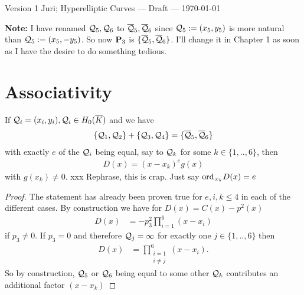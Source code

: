 \documentclass[english,11pt,a4paper]{article}
\begin{document}
\newpage

Version 1 \scriptsize \hfill Juri; Hyperelliptic Curves --- Draft --- \today
\normalsize

\textbf{Note:} I have renamed $\q_5, \q_6$ to $\bar \q_5, \bar \q_6$ since $\q_5 := (x_5,y_5)$ is more natural than $\q_5 := (x_5,-y_5)$. So now $\P_3$ is $\{ \bar \q_5, \bar \q_6 \}$. I'll change it in Chapter 1 as soon as I have the desire to do something tedious.

\section{Associativity}

\begin{lemma}
  If $\q_i = (x_i, y_i) ,\q_i \in \enkb$ and we have 
  \begin{align*}
    \{ \q_1 , \q_2\}+\{\q_3 , \q_4\} = \{\bar \q_5 , \bar \q_6 \}
  \end{align*}
  with exactly $e$ of the $\q_i$ being equal, say to $\q_k$ for some $k \in \{1,..,6\}$, then
  \begin{align*}
    D(x) = (x-x_k)^e g(x)
  \end{align*}
  with $g(x_k) \neq 0$. xxx Rephrase, this is crap. Just say $\ord_{x_k} D(x) = e$
  \begin{proof}
    The statement has already been proven true for $e, i, k \leq 4$ in each of the different cases. By construction we have for $D(x) = C(x) - p^2(x)$
		\begin{align*}
			D(x) &= -p_3^2\prod_{i=1}^6(x-x_i)
		\end{align*}
		if $p_3 \neq 0$. If $p_3 = 0$ and therefore $\q_j = \infty$ for exactly one $j \in \{1,..,6\}$ then
		\begin{align*}
			D(x) &=  \prod_{\substack{i=1\\i \neq j}}^6(x-x_i).
		\end{align*}
		So by construction, $\q_5$ or $\q_6$ being equal to some other $\q_k$ contributes an additional factor $(x-x_k)$
  \end{proof}
\end{lemma}
\end{document}
